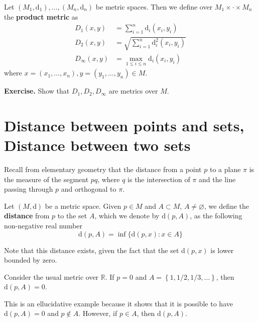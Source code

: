\begin{example}
	Let $(M_1, \mathrm{d}_1), \ldots, (M_n, \mathrm{d}_n)$ be metric spaces. Then we define over $M_1 \times \cdot \times M_n$ the \textbf{product metric} as
	\begin{equation*}
		\begin{aligned}
			D_1(x,y) &= \sum_{i=1}^n \mathrm{d}_i (x_i,y_i) \\
			D_2(x,y) &= \sqrt{\sum_{i=1}^n \mathrm{d}_i^2 (x_i,y_i)} \\
			D_\infty(x,y) &= \max_{1 \leq i \leq n} \mathrm{d}_i(x_i,y_i)
		\end{aligned}
	\end{equation*}
	where $x = (x_1, \ldots, x_n), y = (y_1, \ldots, y_n) \in M$.
	
	\textbf{Exercise.} Show that $D_1, D_2, D_\infty$ are metrics over $M$.
\end{example}

\section{Distance between points and sets, Distance between two sets}

Recall from elementary geometry that the distance from a point $p$ to a plane $\pi$ is the measure of the segment $pq$, where $q$ is the intersection of $\pi$ and the line passing through $p$ and orthogonal to $\pi$. 

\begin{definition}
	Let $(M, \mathrm{d})$ be a metric space. Given $p \in M$ and $A \subset M$, $A \neq \varnothing$, we define the \textbf{distance} from $p$ to the set $A$, which we denote by $\mathrm{d}(p, A)$, as the following non-negative real number
	\begin{equation*}
		\mathrm{d}(p, A) = \inf \{ \mathrm{d}(p,x) : x \in A \}
	\end{equation*}
	
	Note that this distance exists, given the fact that the set $\mathrm{d}(p,x)$ is lower bounded by zero.
\end{definition}

\begin{example}
	Consider the usual metric over $\mathbb{R}$. If $p = 0$ and $A = \left\{ 1, 1/2, 1/3, \ldots \right\}$, then $\mathrm{d}(p,A) = 0$.
	
	This is an ellucidative example because it shows that it is possible to have $\mathrm{d}(p,A) = 0$ and $p \not\in A$. However, if $p \in A$, then $\mathrm{d}(p,A)$.
\end{example}

